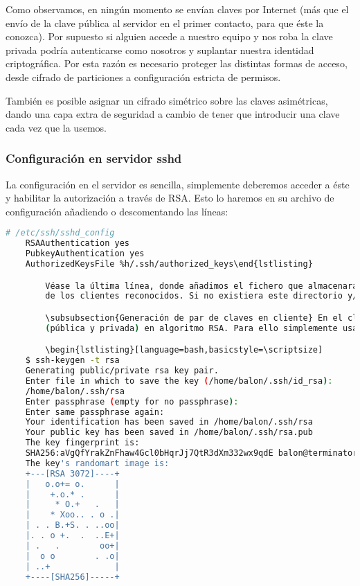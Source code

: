 \documentclass[a4paper, 11pt, titlepage]{article}
\begin{document}
        Como observamos, en ningún momento se envían claves por Internet (más que el envío 
        de la clave pública al servidor en el primer contacto, para que éste la conozca). Por 
        supuesto si alguien accede a nuestro equipo y nos roba la clave privada podría autenticarse 
        como nosotros y suplantar nuestra identidad criptográfica. Por esta razón es necesario 
        proteger las distintas formas de acceso, desde cifrado de particiones a configuración 
        estricta de permisos. 
        
        También es posible asignar un cifrado simétrico sobre las claves asimétricas, dando una 
        capa extra de seguridad a cambio de tener que introducir una clave cada vez que la usemos.
        
        \subsubsection{Configuración en servidor sshd} La configuración en el servidor es sencilla,
        simplemente deberemos acceder a éste y habilitar la autorización a través de RSA. Esto lo haremos 
        en su archivo de configuración añadiendo o descomentando las líneas:

        \begin{lstlisting}[language=bash]
    # /etc/ssh/sshd_config
    RSAAuthentication yes
    PubkeyAuthentication yes
    AuthorizedKeysFile %h/.ssh/authorized_keys\end{lstlisting}

        Véase la última línea, donde añadimos el fichero que almacenará las claves públicas 
        de los clientes reconocidos. Si no existiera este directorio y/o fichero deberemos crearlo.

        \subsubsection{Generación de par de claves en cliente} En el cliente crearemos el par de claves 
        (pública y privada) en algoritmo RSA. Para ello simplemente usaremos 

        \begin{lstlisting}[language=bash,basicstyle=\scriptsize]
    $ ssh-keygen -t rsa
    Generating public/private rsa key pair.
    Enter file in which to save the key (/home/balon/.ssh/id_rsa): 
    /home/balon/.ssh/rsa
    Enter passphrase (empty for no passphrase): 
    Enter same passphrase again: 
    Your identification has been saved in /home/balon/.ssh/rsa
    Your public key has been saved in /home/balon/.ssh/rsa.pub
    The key fingerprint is:
    SHA256:aVgQfYrakZnFhaw4Gcl0bHqrJj7QtR3dXm332wx9qdE balon@terminator
    The key's randomart image is:
    +---[RSA 3072]----+
    |   o.o+= o.      |
    |    +.o.* .      |
    |     * O.+   .   |
    |    * Xoo.. . o .|
    | . . B.+S. . ..oo|
    |. . o +.  .  ..E+|
    | .   .        oo+|
    |  o o        . .o|
    | ..+             |
    +----[SHA256]-----+\end{lstlisting}
\end{document}
